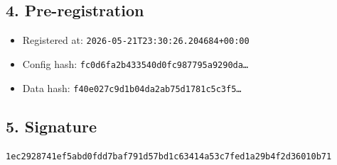 \documentclass{article}
\begin{document}
\subsection*{4. Pre-registration}
\begin{itemize}
\item Registered at: \texttt{2026-05-21T23:30:26.204684+00:00}
\item Config hash: \texttt{fc0d6fa2b433540d0fc987795a9290da\dots}
\item Data hash: \texttt{f40e027c9d1b04da2ab75d1781c5c3f5\dots}
\end{itemize}
\subsection*{5. Signature}
\texttt{1ec2928741ef5abd0fdd7baf791d57bd1c63414a53c7fed1a29b4f2d36010b71}\\
\end{document}
